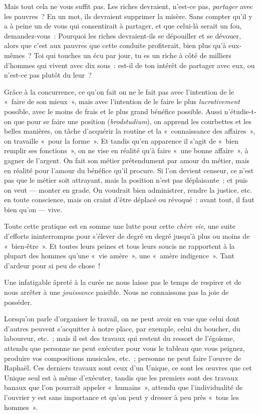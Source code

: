 \documentclass[french,twoside]{book} %
\begin{document}
Mais tout cela ne vous suffit pas. Les riches devraient, n’est-ce pas, \emph{partager} avec les pauvres ? En un mot, ils devraient supprimer la misère. Sans compter qu’il y a à peine un de vous qui consentirait à partager, et que celui-là serait un fou, demandez-vous : Pourquoi les riches devraient-ils se dépouiller et se dévouer, alors que c’est aux pauvres que cette conduite profiterait, bien plus qu’à eux-mêmes ? Toi qui touches un écu par jour, tu es un riche à côté de milliers d’hommes qui vivent avec dix sous : est-il de ton intérêt de partager avec eux, ou n’est-ce pas plutôt du leur ?\par
Grâce à la concurrence, ce qu’on fait on ne le fait pas avec l’intention de le « faire de son mieux », mais avec l’intention de le faire le plus \emph{lucrativement} possible, avec le moins de frais et le plus grand bénéfice possible. Aussi n’étudie-t-on que pour se faire une position (\emph{brodstudium}), on apprend les courbettes et les belles manières, on tâche d’acquérir la routine et la « connaissance des affaires », on travaille « pour la forme ». Et tandis qu’en apparence il s’agit de « bien remplir ses fonctions », on ne vise en réalité qu’à faire « une bonne affaire », à gagner de l’argent. On  fait son métier prétendument par amour du métier, mais en réalité pour l’amour du bénéfice qu’il procure. Si l’on devient censeur, ce n’est pas que le métier soit attrayant, mais la position n’est pas déplaisante ; et puis on veut — monter en grade. On voudrait bien administrer, rendre la justice, etc. en toute conscience, mais on craint d’être déplacé ou révoqué : avant tout, il faut bien qu’on — vive.\par
Toute cette pratique est en somme une lutte pour cette \emph{chère vie}, une suite d’efforts ininterrompus pour s’élever de degré en degré jusqu’à plus ou moins de « bien-être ». Et toutes leurs peines et tous leurs soucis ne rapportent à la plupart des hommes qu’une « vie amère », une « amère indigence ». Tant d’ardeur pour si peu de chose !\par
Une infatigable âpreté à la curée ne nous laisse pas le temps de respirer et de nous arrêter à une \emph{jouissance} paisible. Nous ne connaissons pas la joie de posséder.\par
Lorsqu’on parle d’organiser le travail, on ne peut avoir en vue que celui dont d’autres peuvent s’acquitter à notre place, par exemple, celui du boucher, du laboureur, etc. ; mais il est des travaux qui restent du ressort de l’égoïsme, attendu que personne ne peut exécuter pour vous le tableau que vous peignez, produire vos compositions musicales, etc. ; personne ne peut faire l’œuvre de Raphaël. Ces derniers travaux sont ceux d’un Unique, ce sont les œuvres que cet Unique seul est à même d’exécuter, tandis que les premiers sont des travaux banaux que l’on pourrait appeler « humains », attendu que l’individualité de l’ouvrier y est sans importance et qu’on peut y dresser à peu près « tous les hommes ».\par
\end{document}
